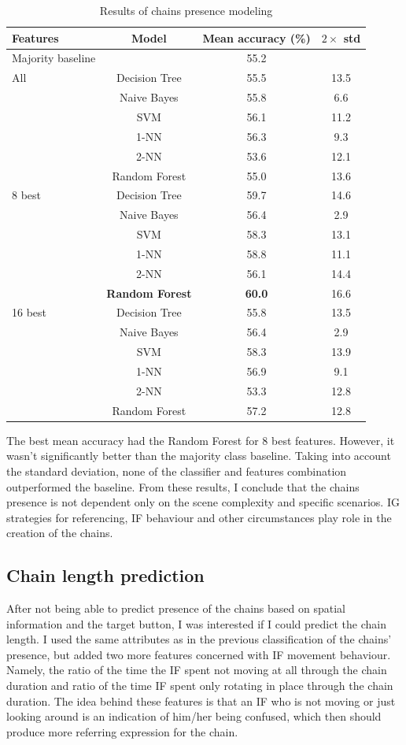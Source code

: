 \begin{table}[!htbp]
 \centering
\begin{tabular}{lccc}
\toprule
Features & Model    & Mean accuracy (\%) & $2\times$ std \\
\midrule
Majority baseline &    & 55.2	& \\
\midrule
All & Decision Tree 	& 55.5		& 13.5 	\\
	& Naive Bayes  	& 55.8		& 6.6 	\\
	& SVM 			& 56.1		& 11.2 	\\
	& 1-NN			& 56.3		& 9.3 	\\
	& 2-NN			& 53.6		& 12.1 	\\
	& Random Forest	& 55.0		& 13.6	\\
\midrule
8 best 	& Decision Tree 	& 	59.7		& 14.6  	\\
		& Naive Bayes  	&	56.4		& 2.9 	\\
		& SVM 			&	58.3		& 13.1 	\\
		& 1-NN			&	58.8		& 11.1 	\\
		& 2-NN			&	56.1		& 14.4 	\\
		& \textbf{Random Forest}	&	\textbf{60.0	}	& 16.6 	\\
\midrule
16 best & Decision Tree 	& 55.8	& 13.5  	\\
	& Naive Bayes  		& 56.4	& 2.9 	\\
	& SVM 				& 58.3	& 13.9  	\\
	& 1-NN				& 56.9	& 9.1  	\\
	& 2-NN				& 53.3	& 12.8  	\\
	& Random Forest		& 57.2	& 12.8  	\\	
\bottomrule
\end{tabular}
\caption{Results of chains presence modeling}
\label{tab:chains-ml-presence}
\end{table}

The best mean accuracy had the Random Forest for 8 best features. However, it wasn't significantly better than the majority class baseline. Taking into account the standard deviation, none of the classifier and features combination outperformed the baseline.  From these results, I conclude that the chains presence is not dependent only on the scene complexity and specific scenarios. IG strategies for referencing, IF behaviour and other circumstances play role in the creation of the chains.

\subsection{Chain length prediction}
After not being able to predict presence of the chains based on spatial information and the target button, I was interested if I could predict the chain length. I used the same attributes as in the previous classification of the chains' presence, but added two more features concerned with IF movement behaviour. Namely, the ratio of the time the IF spent not moving at all through the chain duration and ratio of the time IF spent only rotating in place through the chain duration. The idea behind these features is that an IF who is not moving or just looking around is an indication of him/her being confused, which then should produce more referring expression for the chain.

